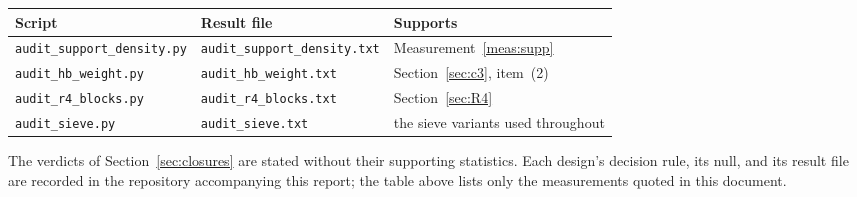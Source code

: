 \documentclass[11pt,a4paper]{article}
\theoremstyle{plain}
\theoremstyle{definition}
\theoremstyle{remark}
\begin{document}
\begin{center}
\small
\begin{tabular}{lll}
\hline
Script & Result file & Supports\\
\hline
\texttt{audit\_support\_density.py} &
 \texttt{audit\_support\_density.txt} & Measurement~\ref{meas:supp}\\
\texttt{audit\_hb\_weight.py} & \texttt{audit\_hb\_weight.txt}
 & Section~\ref{sec:c3}, item~(2)\\
\texttt{audit\_r4\_blocks.py} & \texttt{audit\_r4\_blocks.txt}
 & Section~\ref{sec:R4}\\
\texttt{audit\_sieve.py} & \texttt{audit\_sieve.txt}
 & the sieve variants used throughout\\
\hline
\end{tabular}
\end{center}

The verdicts of Section~\ref{sec:closures} are stated without their
supporting statistics. Each design's decision rule, its null, and its
result file are recorded in the repository accompanying this report;
the table above lists only the measurements quoted in this document.
\end{document}

